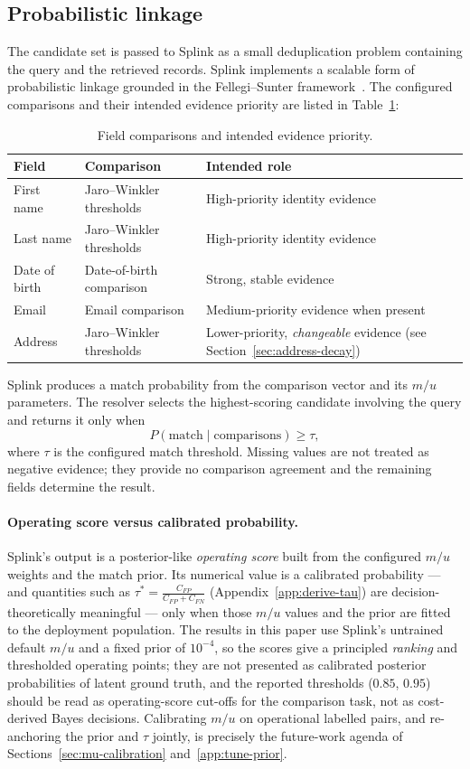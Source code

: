 \documentclass[11pt]{article}
\begin{document}
\subsection{Probabilistic linkage}
\label{sec:prob-linkage}
The candidate set is passed to Splink as a small deduplication problem containing the query and the retrieved records. Splink implements a scalable form of probabilistic linkage grounded in the Fellegi--Sunter framework~\cite{fellegi1969,linacre2022}. The configured comparisons and their intended evidence priority are listed in Table~\ref{tab:evidence-priority}:
\begin{table}[h]
\centering
\caption{Field comparisons and intended evidence priority.}
\label{tab:evidence-priority}
\begin{tabular}{lll}
\toprule
Field & Comparison & Intended role \\
\midrule
First name & Jaro--Winkler thresholds & High-priority identity evidence \\
Last name & Jaro--Winkler thresholds & High-priority identity evidence \\
Date of birth & Date-of-birth comparison & Strong, stable evidence \\
Email & Email comparison & Medium-priority evidence when present \\
Address & Jaro--Winkler thresholds & Lower-priority, \emph{changeable} evidence (see Section~\ref{sec:address-decay}) \\
\bottomrule
\end{tabular}
\end{table}

Splink produces a match probability from the comparison vector and its $m/u$ parameters. The resolver selects the highest-scoring candidate involving the query and returns it only when
\[
 P(\mathrm{match}\mid\text{comparisons}) \geq \tau,
\]
where $\tau$ is the configured match threshold. Missing values are not treated as negative evidence; they provide no comparison agreement and the remaining fields determine the result.

\paragraph{Operating score versus calibrated probability.} Splink's output is a posterior-like \emph{operating score} built from the configured $m/u$ weights and the match prior. Its numerical value is a calibrated probability --- and quantities such as $\tau^*=\frac{C_{FP}}{C_{FP}+C_{FN}}$ (Appendix~\ref{app:derive-tau}) are decision-theoretically meaningful --- only when those $m/u$ values and the prior are fitted to the deployment population. The results in this paper use Splink's untrained default $m/u$ and a fixed prior of $10^{-4}$, so the scores give a principled \emph{ranking} and thresholded operating points; they are not presented as calibrated posterior probabilities of latent ground truth, and the reported thresholds ($0.85$, $0.95$) should be read as operating-score cut-offs for the comparison task, not as cost-derived Bayes decisions. Calibrating $m/u$ on operational labelled pairs, and re-anchoring the prior and $\tau$ jointly, is precisely the future-work agenda of Sections~\ref{sec:mu-calibration} and~\ref{app:tune-prior}.
\end{document}
